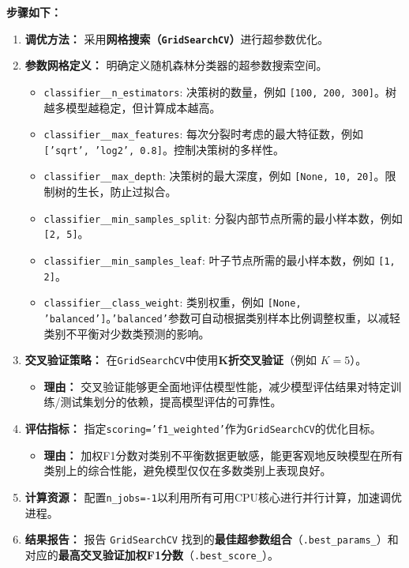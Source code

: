 \documentclass[withoutpreface,bwprint]{cumcmthesis}
\begin{document}
\textbf{步骤如下：}
    \begin{enumerate}
        \item \textbf{调优方法：} 采用\textbf{网格搜索（\texttt{GridSearchCV}）}进行超参数优化。
        
        \item \textbf{参数网格定义：} 明确定义随机森林分类器的超参数搜索空间。
        \begin{itemize}
            \item \texttt{classifier\_\_n\_estimators}: 决策树的数量，例如 \texttt{[100, 200, 300]}。树越多模型越稳定，但计算成本越高。
            \item \texttt{classifier\_\_max\_features}: 每次分裂时考虑的最大特征数，例如 \texttt{['sqrt', 'log2', 0.8]}。控制决策树的多样性。
            \item \texttt{classifier\_\_max\_depth}: 决策树的最大深度，例如 \texttt{[None, 10, 20]}。限制树的生长，防止过拟合。
            \item \texttt{classifier\_\_min\_samples\_split}: 分裂内部节点所需的最小样本数，例如 \texttt{[2, 5]}。
            \item \texttt{classifier\_\_min\_samples\_leaf}: 叶子节点所需的最小样本数，例如 \texttt{[1, 2]}。
            \item \texttt{classifier\_\_class\_weight}: 类别权重，例如 \texttt{[None, 'balanced']}。\texttt{'balanced'}参数可自动根据类别样本比例调整权重，以减轻类别不平衡对少数类预测的影响。
        \end{itemize}
        
        \item \textbf{交叉验证策略：} 在\texttt{GridSearchCV}中使用\textbf{K折交叉验证}（例如 $K=5$）。
        \begin{itemize}
            \item \textbf{理由：} 交叉验证能够更全面地评估模型性能，减少模型评估结果对特定训练/测试集划分的依赖，提高模型评估的可靠性。
        \end{itemize}
        
        \item \textbf{评估指标：} 指定\texttt{scoring='f1\_weighted'}作为\texttt{GridSearchCV}的优化目标。
        \begin{itemize}
            \item \textbf{理由：} 加权F1分数对类别不平衡数据更敏感，能更客观地反映模型在所有类别上的综合性能，避免模型仅仅在多数类别上表现良好。
        \end{itemize}
        
        \item \textbf{计算资源：} 配置\texttt{n\_jobs=-1}以利用所有可用CPU核心进行并行计算，加速调优进程。
        
        \item \textbf{结果报告：} 报告 \texttt{GridSearchCV} 找到的\textbf{最佳超参数组合}（\texttt{.best\_params\_}）和对应的\textbf{最高交叉验证加权F1分数}（\texttt{.best\_score\_}）。
    \end{enumerate}
    
\end{document}
